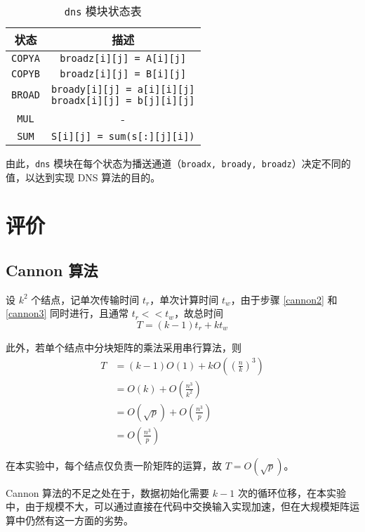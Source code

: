 \documentclass{zjureport-zh}
\begin{document}
\begin{table}[h]
	\centering
	\caption{\texttt{dns} 模块状态表} \label{dns_statetab}
	\vspace{1ex}
	\begin{tabular}{cc}
		\hline
		状态 & 描述 \\
		\hline
		\texttt{COPYA} & \texttt{broadz[i][j] = A[i][j]} \\
		\hline
		\texttt{COPYB} & \texttt{broadz[i][j] = B[i][j]} \\
		\hline
		\texttt{BROAD} & \makecell{\texttt{broady[i][j] = a[i][i][j]} \\ \texttt{broadx[i][j] = b[j][i][j]}} \\
		\hline
		\texttt{MUL} & - \\
		\hline
		\texttt{SUM} & \texttt{S[i][j] = sum(s[:][j][i])} \\
		\hline
	\end{tabular}
\end{table}

\par 由此，\texttt{dns} 模块在每个状态为播送通道（\texttt{broadx, broady, broadz}）决定不同的值，以达到实现 DNS 算法的目的。

\section{评价}
\subsection{Cannon 算法}
\par 设 $k^2$ 个结点，记单次传输时间 $t_r$，单次计算时间 $t_w$，由于步骤 \ref{cannon2} 和 \ref{cannon3} 同时进行，且通常 $t_r << t_w$，故总时间
$$
	T = (k-1)t_r + kt_w
$$
\par 此外，若单个结点中分块矩阵的乘法采用串行算法，则
\begin{align*}
	T &= (k-1)O(1) + kO((\frac{n}{k})^3) \\
	  &= O(k) + O(\frac{n^3}{k^2}) \\
	  &= O(\sqrt{p}) + O(\frac{n^3}{p}) \\
	  &= O(\frac{n^3}{p})
\end{align*}
\par 在本实验中，每个结点仅负责一阶矩阵的运算，故 $T = O(\sqrt{p})$。
\par Cannon 算法的不足之处在于，数据初始化需要 $k-1$ 次的循环位移，在本实验中，由于规模不大，可以通过直接在代码中交换输入实现加速，但在大规模矩阵运算中仍然有这一方面的劣势。
\end{document}
